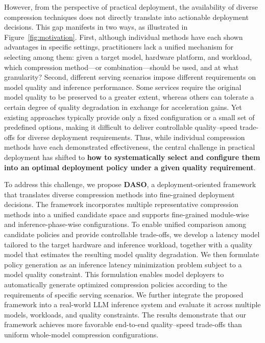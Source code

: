 \documentclass[letterpaper]{article} %
\begin{document}
However, from the perspective of practical deployment, the availability of diverse compression techniques does not directly translate into actionable deployment decisions. This gap manifests in two ways, as illustrated in Figure~\ref{fig:motivation}. First, although individual methods have each shown advantages in specific settings, practitioners lack a unified mechanism for selecting among them: given a target model, hardware platform, and workload, which compression method---or combination---should be used, and at what granularity? Second, different serving scenarios impose different requirements on model quality and inference performance. Some services require the original model quality to be preserved to a greater extent, whereas others can tolerate a certain degree of quality degradation in exchange for acceleration gains. Yet existing approaches typically provide only a fixed configuration or a small set of predefined options, making it difficult to deliver controllable quality--speed trade-offs for diverse deployment requirements. Thus, while individual compression methods have each demonstrated effectiveness, the central challenge in practical deployment has shifted to \textbf{how to systematically select and configure them into an optimal deployment policy under a given quality requirement}.

To address this challenge, we propose \textbf{DASO}, a deployment-oriented framework that translates diverse compression methods into fine-grained deployment decisions. The framework incorporates multiple representative compression methods into a unified candidate space and supports fine-grained module-wise and inference-phase-wise configurations. To enable unified comparison among candidate policies and provide controllable trade-offs, we develop a latency model tailored to the target hardware and inference workload, together with a quality model that estimates the resulting model quality degradation. We then formulate policy generation as an inference latency minimization problem subject to a model quality constraint. This formulation enables model deployers to automatically generate optimized compression policies according to the requirements of specific serving scenarios. We further integrate the proposed framework into a real-world LLM inference system and evaluate it across multiple models, workloads, and quality constraints. The results demonstrate that our framework achieves more favorable end-to-end quality--speed trade-offs than uniform whole-model compression configurations.
\end{document}
